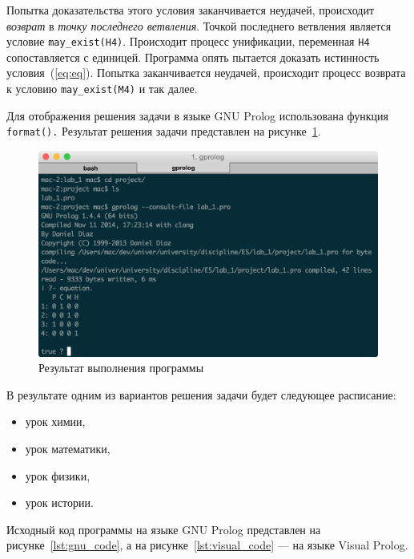 Попытка доказательства этого условия
заканчивается неудачей, происходит \textit{возврат} в \textit{точку последнего
ветвления}. Точкой последнего ветвления является условие \texttt{may\_exist(H4)}.
Происходит процесс унификации, переменная \texttt{H4} сопоставляется с единицей.
Программа опять пытается доказать истинность условия~(\ref{eq:eq}). Попытка
заканчивается неудачей, происходит процесс возврата
к условию \texttt{may\_exist(M4)} и так далее.

Для отображения решения задачи в языке GNU Prolog использована функция \texttt{format().}
Результат решения задачи представлен на рисунке~\ref{fig:figure}.

\begin{figure}[h!]
  \centering
  \includegraphics[width=150mm]{img/figure}
  \caption{Результат выполнения программы}
  \label{fig:figure}
\end{figure}

В результате одним из вариантов решения задачи будет следующее расписание:
\begin{itemize}
  \item урок химии,
  \item урок математики,
  \item урок физики,
  \item урок истории.
\end{itemize}

\pagebreak
Исходный код программы на языке GNU Prolog представлен на рисунке~\ref{lst:gnu_code}, а на рисунке~\ref{lst:visual_code} ---
на языке Visual Prolog.

